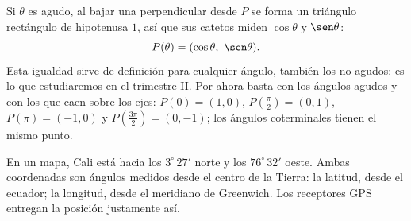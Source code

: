 \documentclass[11pt]{article}
\begin{document}
Si $\theta$ es agudo, al bajar una perpendicular desde $P$ se forma un triángulo
rectángulo de hipotenusa $1$, así que sus catetos miden $\cos\theta$ y
$\sen\theta$:
\[
  P(\theta) = (\cos\theta,\ \sen\theta).
\]
Esta igualdad sirve de definición para cualquier ángulo, también los no agudos:
es lo que estudiaremos en el trimestre II. Por ahora basta con los ángulos
agudos y con los que caen sobre los ejes: $P(0) = (1, 0)$,
$P\left(\frac{\pi}{2}\right) = (0, 1)$, $P(\pi) = (-1, 0)$ y
$P\left(\frac{3\pi}{2}\right) = (0, -1)$; los ángulos coterminales tienen el mismo punto.

\begin{center}
\end{center}

\begin{aplicacion}
En un mapa, Cali está hacia los $3^\circ\,27'$ norte y los $76^\circ\,32'$ oeste.
Ambas coordenadas son ángulos medidos desde el centro de la Tierra: la latitud,
desde el ecuador; la longitud, desde el meridiano de Greenwich. Los receptores
GPS entregan la posición justamente así.
\end{aplicacion}
\end{document}
